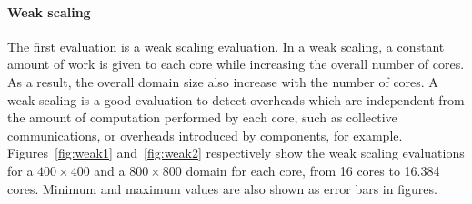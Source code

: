 \paragraph{\textbf{Weak scaling}} The first evaluation is a weak scaling evaluation. In a weak scaling, a constant amount of work is given to each core while increasing the overall number of cores. As a result, the overall domain size also increase with the number of cores. A weak scaling is a good evaluation to detect overheads which are independent from the amount of computation performed by each core, such as collective communications, or overheads introduced by \llc components, for example. Figures~\ref{fig:weak1} and~\ref{fig:weak2} respectively show the weak scaling evaluations for a $400 \times 400$ and a $800 \times 800$ domain for each core, from 16 cores to 16.384 cores. Minimum and maximum values are also shown as error bars in figures.

